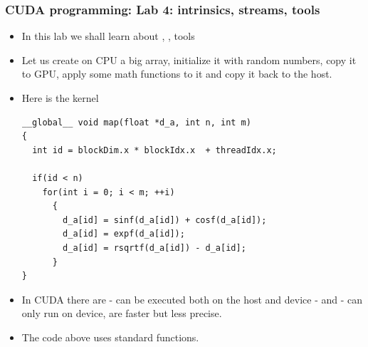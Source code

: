 \begin{frame}[fragile]
  \frametitle{CUDA programming: Lab 4: intrinsics, streams, tools}
\begin{itemize}
\item In this lab we shall learn about , ,  tools
\item Let us create on CPU a big array, initialize it with random numbers, copy it to GPU, apply some math functions to it and copy it back to the host.
\item Here is the kernel
{\tiny
{\color{mycolorcode}
\begin{verbatim}
__global__ void map(float *d_a, int n, int m)
{
  int id = blockDim.x * blockIdx.x  + threadIdx.x;
  
  if(id < n)
    for(int i = 0; i < m; ++i)
      {
        d_a[id] = sinf(d_a[id]) + cosf(d_a[id]);
        d_a[id] = expf(d_a[id]);
        d_a[id] = rsqrtf(d_a[id]) - d_a[id];
      }
}
\end{verbatim}
}
}
\item In CUDA there are  - can be executed both on the host and device -  and  - can only run on device, are faster but less precise.
\item The code above uses standard functions.
\end{itemize}
\end{frame}


